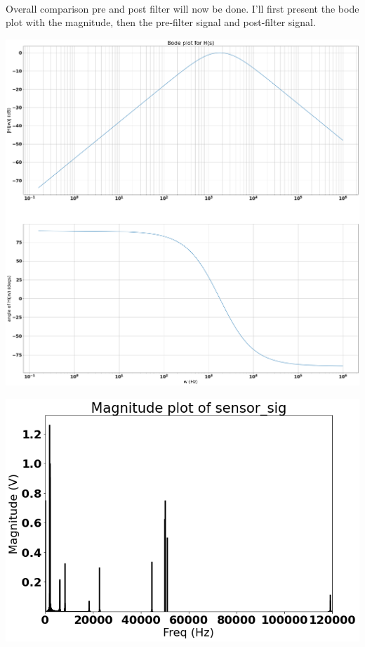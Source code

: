 \documentclass[12pt]{report}
\begin{document}
    \paragraph{} Overall comparison pre and post filter will now be done. I'll first present the bode plot with the magnitude, then the pre-filter signal and post-filter signal. 
    
    \includegraphics[scale = 0.2]{Figure 2022-04-20 163927 (6).png}
    
    \includegraphics[scale = 0.5]{Figure 2022-04-20 163927 (1).png}
    
\end{document}
